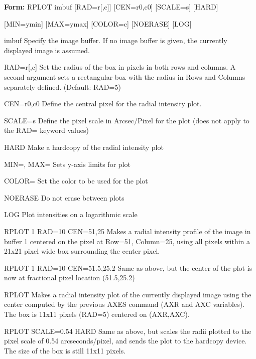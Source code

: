 {\newpage\clearpage
{}%
\begin{command}
  \item[\textbf{Form: } RPLOT imbuf {[RAD=r{[,c]}]} {[CEN=r0,c0]} 
       {[SCALE=s]} {[HARD]}\hfill]{}
  \item{{[MIN=ymin]} {[MAX=ymax]} {[COLOR=c]} {[NOERASE]} {[LOG]}}
  \item[imbuf]{Specify the image buffer.  If no image buffer
       is given, the currently displayed image is assumed.}
  \item[RAD=r{[,c]}]{ Set the radius of the box in pixels in both rows 
        and columns.  A second argument sets a rectangular 
        box with the radius in Rows and Columns separately 
        defined.  (Default: RAD=5)}
  \item[CEN=r0,c0]{ Define the central pixel for the radial intensity
       plot.}
  \item[SCALE=s]{Define the pixel scale in Arcsec/Pixel for the plot
       (does not apply to the RAD= keyword values)}
  \item[HARD]{Make a hardcopy of the radial intensity plot }
  \item[MIN=, MAX=]{ Sets y-axis limits for plot}
  \item[COLOR=]{ Set the color to be used for the plot}
  \item[NOERASE]{ Do not erase between plots}
  \item[LOG]{ Plot intensities on a logarithmic scale}
\end{command}%
\lthtmlfigureZ
\lthtmlcheckvsize\clearpage}

{\newpage\clearpage
{}%
\begin{example}
  \item[RPLOT 1 RAD=10 CEN=51,25\hfill]{
   Makes a radial intensity profile of the image in buffer 1 centered on
   the pixel at Row=51, Column=25, using all pixels within a 21x21 pixel
   wide box surrounding the center pixel.}
  \item[RPLOT 1 RAD=10 CEN=51.5,25.2\hfill]{
   Same as above, but the center of the plot is now at fractional pixel
   location (51.5,25.2)}
  \item[RPLOT\hfill]{
   Makes a radial intensity plot of the currently displayed image using
   the center computed by the previous AXES command (AXR and AXC variables).
   The box is 11x11 pixels (RAD=5) centered on (AXR,AXC).}
  \item[RPLOT SCALE=0.54 HARD\hfill]{
   Same as above, but scales the radii plotted to the pixel scale of 0.54
   arcseconds/pixel, and sends the plot to the hardcopy device.  The size
   of the box is still 11x11 pixels.}
\end{example}%
\lthtmlfigureZ
\lthtmlcheckvsize\clearpage}

